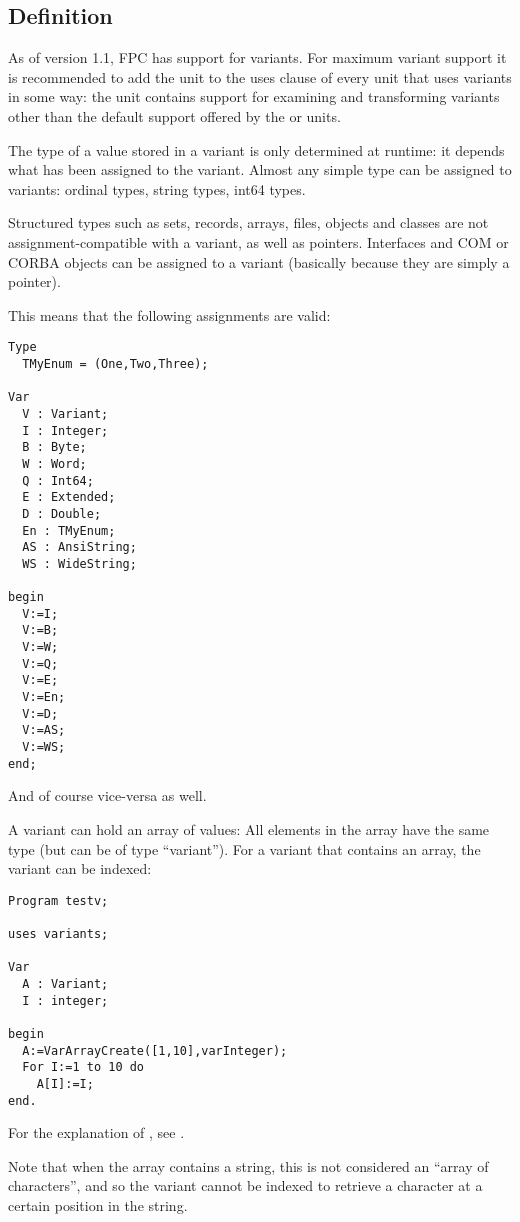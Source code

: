 \subsection{Definition}
As of version 1.1, FPC has support for variants. For maximum variant support
it is recommended to add the  unit to the uses clause of every
unit that uses variants in some way: the  unit contains support for
examining and transforming variants other than the default support offered
by the  or  units.

The type of a value stored in a variant is only determined at runtime:
it depends what has been assigned to the variant. Almost any simple type
can be assigned to variants: ordinal types, string types, int64 types.

Structured types such as sets, records, arrays, files, objects and classes
are not assignment-compatible with a variant, as well as pointers.
Interfaces and COM or CORBA objects can be assigned to a
variant (basically because they are simply a pointer).

This means that the following assignments are valid:
\begin{verbatim}
Type
  TMyEnum = (One,Two,Three);

Var
  V : Variant;
  I : Integer;
  B : Byte;
  W : Word;
  Q : Int64;
  E : Extended;
  D : Double;
  En : TMyEnum;
  AS : AnsiString;
  WS : WideString;

begin
  V:=I;
  V:=B;
  V:=W;
  V:=Q;
  V:=E;
  V:=En;
  V:=D;
  V:=AS;
  V:=WS;
end;
\end{verbatim}
And of course vice-versa as well.

A variant can hold an array of values: All elements in the array have
the same type (but can be of type ``variant''). For a variant
that contains an array, the variant can be indexed:
\begin{verbatim}
Program testv;

uses variants;

Var
  A : Variant;
  I : integer;

begin
  A:=VarArrayCreate([1,10],varInteger);
  For I:=1 to 10 do
    A[I]:=I;
end.
\end{verbatim}
For the explanation of , see \unitsref.

Note that when the array contains a string, this is not considered an ``array
of characters'', and so the variant cannot be indexed to retrieve a character
at a certain position in the string.


